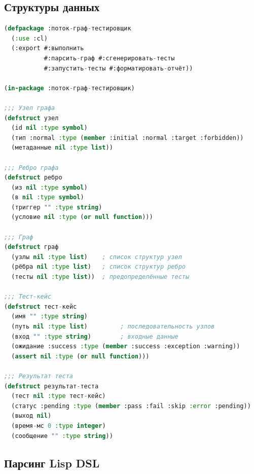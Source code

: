 \documentclass[10pt, oneside]{article}
\begin{document}
\subsection{Структуры данных}

\begin{lstlisting}[language=CommonLisp,caption={Базовые структуры данных}]
(defpackage :поток-граф-тестировщик
  (:use :cl)
  (:export #:выполнить
           #:парсить-граф #:сгенерировать-тесты
           #:запустить-тесты #:форматировать-отчёт))

(in-package :поток-граф-тестировщик)

;;; Узел графа
(defstruct узел
  (id nil :type symbol)
  (тип :normal :type (member :initial :normal :target :forbidden))
  (метаданные nil :type list))

;;; Ребро графа
(defstruct ребро
  (из nil :type symbol)
  (в nil :type symbol)
  (триггер "" :type string)
  (условие nil :type (or null function)))

;;; Граф
(defstruct граф
  (узлы nil :type list)    ; список структур узел
  (рёбра nil :type list)   ; список структур ребро
  (тесты nil :type list))  ; предопределённые тесты

;;; Тест-кейс
(defstruct тест-кейс
  (имя "" :type string)
  (путь nil :type list)         ; последовательность узлов
  (вход "" :type string)        ; входные данные
  (ожидание :success :type (member :success :exception :warning))
  (assert nil :type (or null function)))

;;; Результат теста
(defstruct результат-теста
  (тест nil :type тест-кейс)
  (статус :pending :type (member :pass :fail :skip :error :pending))
  (выход nil)
  (время-мс 0 :type integer)
  (сообщение "" :type string))
\end{lstlisting}

\subsection{Парсинг Lisp DSL}
\end{document}
